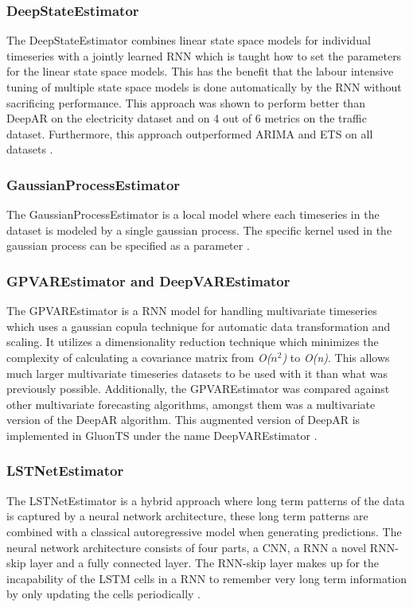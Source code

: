 \subsubsection{DeepStateEstimator}
The DeepStateEstimator combines linear state space models for individual timeseries with a jointly learned RNN which is taught how to set the parameters for the linear state space models. This has the benefit that the labour intensive tuning of multiple state space models is done automatically by the RNN without sacrificing performance. This approach was shown to perform better than DeepAR on the electricity dataset and on 4 out of 6 metrics on the traffic dataset. Furthermore, this approach outperformed ARIMA and ETS on all datasets \cite{rangapuram_deep_2018}.

\subsubsection{GaussianProcessEstimator}
The GaussianProcessEstimator is a local model where each timeseries in the dataset is modeled by a single gaussian process.
The specific kernel used in the gaussian process can be specified as a parameter \cite{gluonts-website}.

\subsubsection{GPVAREstimator and DeepVAREstimator}
\label{algo:gpvar}
The GPVAREstimator is a RNN model for handling multivariate timeseries which uses a gaussian copula technique for automatic data transformation and scaling. It utilizes a dimensionality reduction technique which minimizes the complexity of calculating a covariance matrix from \textit{O($n^2$)} to \textit{O(n)}. This allows much larger multivariate timeseries datasets to be used with it than what was previously possible. Additionally, the GPVAREstimator was compared against other multivariate forecasting algorithms, amongst them was a multivariate version of the DeepAR algorithm. This augmented version of DeepAR is implemented in GluonTS under the name DeepVAREstimator \cite{salinas_high-dimensional_2019}.

\subsubsection{LSTNetEstimator}
The LSTNetEstimator is a hybrid approach where long term patterns of the data is captured by a neural network architecture, these long term patterns are combined with a classical autoregressive model when generating predictions. The neural network architecture consists of four parts, a CNN, a RNN a novel RNN-skip layer and a fully connected layer. The RNN-skip layer makes up for the incapability of the LSTM cells in a RNN to remember very long term information by only updating the cells periodically \cite{lai_modeling_2018}.

